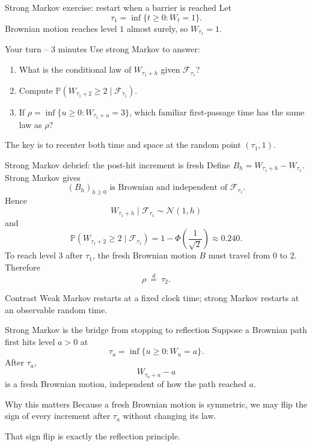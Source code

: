 \documentclass[10pt,aspectratio=169]{beamer}
\newcommand{\Pp}{\mathbb P}
\newcommand{\F}{\mathcal F}
\begin{document}
\begin{frame}{Strong Markov exercise: restart when a barrier is reached}
Let
\[
\tau_1=\inf\{t\ge0:W_t=1\}.
\]
Brownian motion reaches level \(1\) almost surely, so \(W_{\tau_1}=1\).
\begin{block}{Your turn -- 3 minutes}
Use strong Markov to answer:
\begin{enumerate}\setlength{\itemsep}{0.55em}
  \item What is the conditional law of \(W_{\tau_1+h}\) given \(\F_{\tau_1}\)?
  \item Compute \(\Pp(W_{\tau_1+2}\ge2\mid\F_{\tau_1})\).
  \item If \(\rho=\inf\{u\ge0:W_{\tau_1+u}=3\}\), which familiar first-passage time has the same law as \(\rho\)?
\end{enumerate}
\end{block}
The key is to recenter both time and space at the random point \((\tau_1,1)\).
\end{frame}

\begin{frame}{Strong Markov debrief: the post-hit increment is fresh}
\small
Define \(B_h=W_{\tau_1+h}-W_{\tau_1}\). Strong Markov gives
\[
(B_h)_{h\ge0}\text{ is Brownian and independent of }\F_{\tau_1}.
\]
Hence
\[
W_{\tau_1+h}\mid\F_{\tau_1}\sim\mathcal N(1,h)
\]
and
\[
\Pp(W_{\tau_1+2}\ge2\mid\F_{\tau_1})
=1-\Phi\!\left(\frac1{\sqrt2}\right)
\approx0.240.
\]
To reach level \(3\) after \(\tau_1\), the fresh Brownian motion \(B\) must travel from \(0\) to \(2\). Therefore
\[
\rho\ \overset d=\ \tau_2.
\]
\begin{block}{Contrast}
Weak Markov restarts at a fixed clock time; strong Markov restarts at an observable random time.
\end{block}
\end{frame}

\begin{frame}{Strong Markov is the bridge from stopping to reflection}
Suppose a Brownian path first hits level \(a>0\) at
\[
\tau_a=\inf\{u\ge0:W_u=a\}.
\]
After \(\tau_a\),
\[
W_{\tau_a+u}-a
\]
is a fresh Brownian motion, independent of how the path reached \(a\).
\begin{block}{Why this matters}
Because a fresh Brownian motion is symmetric, we may flip the sign of every increment after \(\tau_a\) without changing its law.
\end{block}
That sign flip is exactly the reflection principle.
\end{frame}
\end{document}
